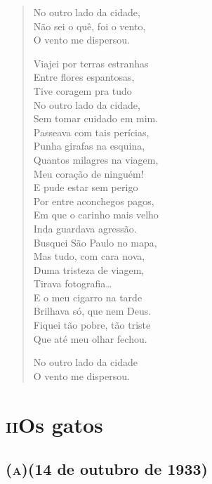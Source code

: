 
\begin{verse}
No outro lado da cidade,\\
Não sei o quê, foi o vento,\\
O vento me dispersou.

Viajei por terras estranhas\\
Entre flores espantosas,\\
Tive coragem pra tudo\\
No outro lado da cidade,\\
Sem tomar cuidado em mim.\\
Passeava com tais perícias,\\
Punha girafas na esquina,\\
Quantos milagres na viagem,\\
Meu coração de ninguém!\\
E pude estar sem perigo\\
Por entre aconchegos pagos,\\
Em que o carinho mais velho\\
Inda guardava agressão.\\
Busquei São Paulo no mapa,\\
Mas tudo, com cara nova,\\
Duma tristeza de viagem,\\
Tirava fotografia\ldots{}\\
E o meu cigarro na tarde\\
Brilhava só, que nem Deus.\\
Fiquei tão pobre, tão triste\\
Que até meu olhar fechou.

No outro lado da cidade\\
O vento me dispersou.
\end{verse}


\chapter[Os gatos]{\textsc{ii}\break Os gatos}

\bigskip

\section*{\textsc{(a)}\break (14 de outubro de 1933)}

